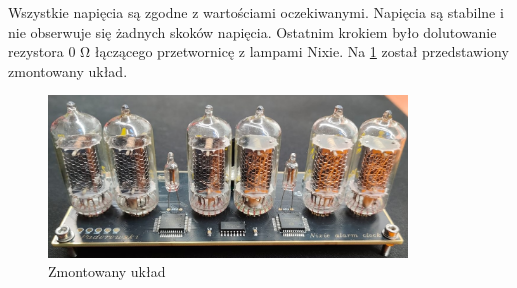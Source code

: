 \documentclass[../main.tex]{subfiles}
\begin{document}
Wszystkie napięcia są zgodne z wartościami oczekiwanymi. Napięcia są stabilne i nie obserwuje się żadnych skoków napięcia.
Ostatnim krokiem było dolutowanie rezystora 0 \si{\ohm} łączącego przetwornicę z lampami Nixie. Na \ref{fig:zmontowany_uklad} został przedstawiony zmontowany układ.

\begin{figure}[H]
    \centering
    \includegraphics[width=0.85\textwidth]{gotowy.jpeg}
    \caption{Zmontowany układ}
    \label{fig:zmontowany_uklad}
\end{figure}
\end{document}
